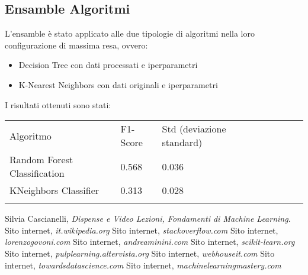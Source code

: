 \documentclass[10pt,a4paper]{article}
\begin{document}
\subsection{Ensamble Algoritmi}
L'ensamble è stato applicato alle due tipologie di algoritmi nella loro configurazione di massima resa, ovvero:

\begin{itemize}
    \item Decision Tree con dati processati e iperparametri
\end{itemize}
\begin{itemize}
    \item K-Nearest Neighbors con dati originali e iperparametri
\end{itemize}
I risultati ottenuti sono stati:

\begin{table}[ht]
\centering
\begin{tabular}{llllllll}
Algoritmo                    & F1-Score & Std (deviazione standard)&  &   \\
Random Forest Classification & 0.568   & 0.036    &  &   \\
KNeighbors Classifier        & 0.313   & 0.028    &  &   \\
                             &         &          &  &  
\end{tabular}
\end{table}

\clearpage
\begin{thebibliography}{9}
\bibitem{}
        Silvia Cascianelli,
        \textit{Dispense e Video Lezioni, Fondamenti di Machine Learning}.
    \bibitem{}
        Sito internet,
        \textit{it.wikipedia.org}
    \bibitem{}
        Sito internet,
        \textit{stackoverflow.com}
    \bibitem{}
        Sito internet,
        \textit{lorenzogovoni.com}
    \bibitem{}
        Sito internet,
        \textit{andreaminini.com}
    \bibitem{}
        Sito internet,
        \textit{scikit-learn.org}
    \bibitem{}
        Sito internet,
        \textit{pulplearning.altervista.org}
    \bibitem{}
        Sito internet,
        \textit{webhouseit.com}
    \bibitem{}
        Sito internet,
        \textit{towardsdatascience.com}
    \bibitem{}
        Sito internet,
        \textit{machinelearningmastery.com}
    
  


\end{thebibliography}
\end{document}
